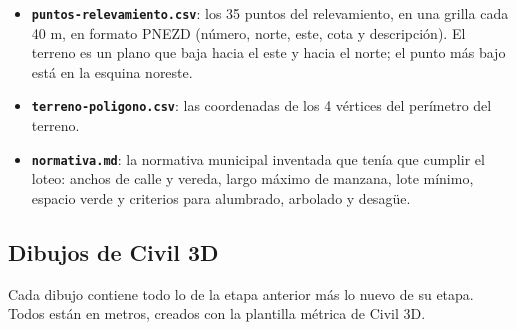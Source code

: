 \documentclass[12pt, a4paper]{article}
\begin{document}
\begin{itemize}[itemsep=4pt]
  \item \textbf{\texttt{puntos-relevamiento.csv}}: los 35 puntos del relevamiento, en una
  grilla cada 40 m, en formato PNEZD (número, norte, este, cota y descripción). El terreno es
  un plano que baja hacia el este y hacia el norte; el punto más bajo está en la esquina
  noreste.
  \item \textbf{\texttt{terreno-poligono.csv}}: las coordenadas de los 4 vértices del
  perímetro del terreno.
  \item \textbf{\texttt{normativa.md}}: la normativa municipal inventada que tenía que cumplir
  el loteo: anchos de calle y vereda, largo máximo de manzana, lote mínimo, espacio verde y
  criterios para alumbrado, arbolado y desagüe.
\end{itemize}

\subsection{Dibujos de Civil 3D}

Cada dibujo contiene todo lo de la etapa anterior más lo nuevo de su etapa. Todos están en
metros, creados con la plantilla métrica de Civil 3D.
\end{document}
